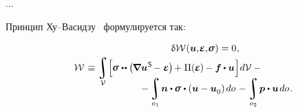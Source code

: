 \begin{otherlanguage}{russian}
...


Принцип Ху\hbox{--}Васидзу~\cite{washizu} формулируется так:

\nopagebreak\vspace{-0.2em}\begin{multline}\label{huwashizuvariationalprinciple}
\hfil \variation{\mathcal{W}} \hspace{.1ex} (\bm{u}, \hspace{-0.32ex}\mathboldepsilon, \hspace{-0.32ex}\linearstress) = 0
\hspace{.1ex} ,
\\[-0.1em]
%
\shoveleft{\displaystyle \mathcal{W} \hspace{0.2ex} \equiv
\integral\displaylimits_{\mathcal{V}} \hspace{-0.4ex}
\left[^{\mathstrut} \hspace{-0.2ex}
\linearstress \dotdotp \hspace{-0.4ex} \left( \hspace{-0.2ex} \boldnabla {\bm{u}}^{\hspace{0.08ex}\mathsf{S}} \hspace{-0.2ex} - \mathboldepsilon \hspace{-0.1ex} \right) \hspace{-0.25ex} + \hspace{.1ex} \Pi(\hspace{-0.1ex}\mathboldepsilon\hspace{-0.1ex})\hspace{-0.1ex} -
\bm{f} \hspace{-0.1ex} \dotp \bm{u}
\hspace{.1ex} \right] \hspace{-0.32ex} d\mathcal{V} \hspace{.5ex} - \hfill} \\[-1.2em]
%
\hspace{8em} \displaystyle - \integral\displaylimits_{o_1} \hspace{-0.25ex} \bm{n} \dotp \hspace{-0.1ex} \linearstress \dotp \left( \bm{u} - \bm{u}_{\raisemath{-0.1em}{0}} \right) \hspace{-0.1ex} do \hspace{0.2ex} -
\integral\displaylimits_{o_2} \hspace{-0.2ex} \bm{p} \dotp \bm{u} \hspace{.25ex} do
\hspace{.2ex} .
\end{multline}


\end{otherlanguage}
